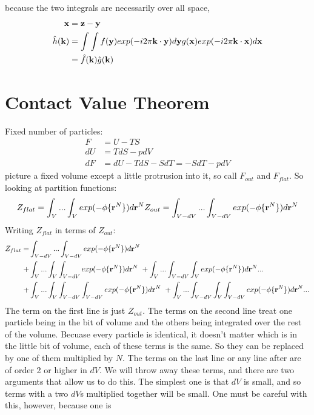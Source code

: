 because the two integrals are necessarily over all space,
\begin{align}
\textbf{x} &= \textbf{z} - \textbf{y} \\
\hat{h}(\textbf{k}) &= \int \int f(\textbf{y}) exp(-i2\pi \textbf{k} \cdot \textbf{y} ) d\textbf{y} g(\textbf{x}) exp(-i2\pi \textbf{k} \cdot \textbf{x}) d\textbf{x} \\
&= \hat{f}(\textbf{k}) \hat{g}(\textbf{k})
\end{align}


\section{Contact Value Theorem}

Fixed number of particles:
\begin{align}
F &= U - TS \\
dU &= TdS -pdV \\
dF &= dU - TdS - SdT = -SdT - pdV
\end{align}
picture a fixed volume except a little protrusion into it, so call
$F_{out}$ and $F_{flat}$.  So looking at partition functions:
\begin{align}
Z_{flat} = \int_V... \int_V exp(-\phi \{\textbf{r}^N \})d\textbf{r}^N
Z_{out} =  \int_{V-dV}... \int_{V-dV} exp(-\phi \{\textbf{r}^N \})d\textbf{r}^N
\end{align}
Writing $Z_{flat}$ in terms of $Z_{out}$:
\begin{align}
Z_{flat} = &\int_{V-dV}... \int_{V-dV} exp(-\phi \{\textbf{r}^N \})d\textbf{r}^N \notag \\
+ &\int_V... \int_V \int_{V-dV} exp(-\phi \{ \textbf{r}^N \})d\textbf{r}^N \
+ \int_V ... \int_{V-dV} \int_V exp(-\phi \{ \textbf{r}^N \})d\textbf{r}^N ... \notag \\
+ &\int_V... \int_{V}\int_{V-dV} \int_{V-dV} exp(-\phi \{\textbf{r}^N \})d\textbf{r}^N \
+ \int_V... \int_{V-dV}\int_V \int_{V-dV} exp(-\phi \{\textbf{r}^N \})d\textbf{r}^N ...
\end{align}
The term on the first line is just $Z_{out}$.  The terms on the second
line treat one particle being in the bit of volume and the others
being integrated over the rest of the volume.  Becuase every particle
is identical, it doesn't matter which is in the little bit of volume,
each of these terms is the same.  So they can be replaced by one of
them multiplied by $N$.  The terms on the last line or any line after
are of order 2 or higher in $dV$.  We will throw away these terms, and
there are two arguments that allow us to do this.  The simplest one is
that $dV$ is small, and so terms with a two $dV$s multiplied together
will be small.  One must be careful with this, however, because one is
